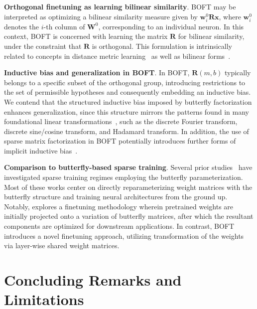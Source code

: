 \textbf{Orthogonal finetuning as learning bilinear similarity}. BOFT may be interpreted as optimizing a bilinear similarity measure given by $\bm{w}^0_i\bm{R}\bm{x}$, where $\bm{w}^0_i$ denotes the $i$-th column of $\bm{W}^0$, corresponding to an individual neuron. In this context, BOFT is concerned with learning the matrix $\bm{R}$ for bilinear similarity, under the constraint that $\bm{R}$ is orthogonal. This formulation is intrinsically related to concepts in distance metric learning~\cite{xing2002distance} as well as bilinear forms~\cite{roman2005advanced}.

\textbf{Inductive bias and generalization in BOFT}. In BOFT, $\bm{R}(m,b)$ typically belongs to a specific subset of the orthogonal group, introducing restrictions to the set of permissible hypotheses and consequently embedding an inductive bias. We contend that the structured inductive bias imposed by butterfly factorization enhances generalization, since this structure mirrors the patterns found in many foundational linear transformations~\cite{dao2019kaleidoscope}, such as the discrete Fourier transform, discrete sine/cosine transform, and Hadamard transform. In addition, the use of sparse matrix factorization in BOFT potentially introduces further forms of implicit inductive bias~\cite{gunasekar2017implicit,li2018algorithmic,liu2019neural}.

\textbf{Comparison to butterfly-based sparse training}. Several prior studies~\cite{dao2019learning,dao2019kaleidoscope,chen2022pixelated,dao2022monarch} have investigated sparse training regimes employing the butterfly parameterization. Most of these works center on directly reparameterizing weight matrices with the butterfly structure and training neural architectures from the ground up. Notably, \cite{dao2022monarch} explores a finetuning methodology wherein pretrained weights are initially projected onto a variation of butterfly matrices, after which the resultant components are optimized for downstream applications. In contrast, BOFT introduces a novel finetuning approach, utilizing transformation of the weights via layer-wise shared weight matrices.



\section{Concluding Remarks and Limitations}

